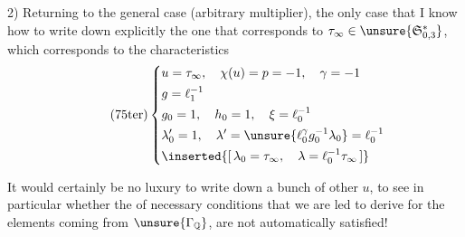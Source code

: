 2) Returning to the general case (arbitrary multiplier), the only case that I know how to write down explicitly
  the one that corresponds to
$\tau_\infty\in\unsure{\mathfrak S_{0,3}^{*}}$,
which corresponds to the characteristics
\[
\tag{75ter}
\left\{
\begin{aligned}
&u=\tau_\infty,\quad\chi(u)=p=-1,\quad\gamma=-1\\
&g=\ell_1^{-1}\\
&g_0=1,\quad h_0=1,\quad\xi=\ell_0^{-1}\\
&\lambda'_0=1,\quad\lambda'=\unsure{\ell_0^\gamma g_0^{-1}\lambda_0}=\ell_0^{-1}\\
&\inserted{[\,\lambda_0=\tau_\infty,\quad\lambda=\ell_0^{-1}\tau_\infty\,]}
\end{aligned}
\right.
\]

It would certainly be no luxury  to write down a bunch of other $u$, to see in particular whether the  of necessary conditions that we are led to derive for the elements coming from $\unsure{\Gamma_{\mathbb Q}}$, are not automatically satisfied!
